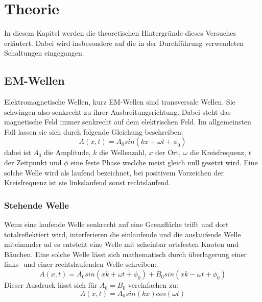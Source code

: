 \section{Theorie} 
\label{sec:Theorie}

In diesem Kapitel werden die theoretischen Hintergründe dieses Versuches erläutert. Dabei wird insbesondere auf die in der Durchführung verwendeten Schaltungen eingegangen.


\subsection{EM-Wellen}
\label{sec:themwellen}
Elektromagnetische Wellen, kurz EM-Wellen sind transversale Wellen. Sie schwingen also senkrecht zu ihrer
Ausbreitungsrichtung. Dabei steht das magnetische Feld immer senkrecht auf dem elektrischen Feld.
Im allgemeinsten Fall lassen sie sich durch folgende Gleichung beschreiben:
\begin{equation}
    \label{eq:wellenfunktion}
    A(x,t)=A_0sin(kx+\omega t+\phi_0)
\end{equation}
dabei ist $A_0$ die Amplitude, $k$ die Wellenzahl, $x$ der Ort, $\omega$ die Kreisfrequenz, $t$ der Zeitpunkt
und $\phi$ eine feste Phase weclche meist gleich null gesetzt wird. Eine solche Welle wird als laufend bezeichnet, bei positivem Vorzeichen der Kreisfrequenz
ist sie linkslaufend sonst rechtslaufend.


\subsubsection{Stehende Welle}
\label{sec:thstehendewelle}
Wenn eine laufende Welle senkrecht auf eine Grenzfläche trifft und dort totalreflektiert wird,
interferieren die einlaufende und die auslaufende Welle miteinander ud es entsteht eine Welle
mit scheinbar ortsfesten Knoten und Bäuchen. Eine solche Welle lässt sich mathematisch durch überlagerung
einer links- und einer rechtslaufenden Welle schreiben:
\begin{equation}
    \label{eq:stehendewelle}
    A(x,t)=A_0sin(xk+\omega t +\phi_0)+B_0sin(xk-\omega t +\phi_0)
\end{equation}
Dieser Ausdruck lässt sich für $A_0=B_0$ vereinfachen zu:
\begin{equation}
    A(x,t)=A_0sin(kx)cos(\omega t)
\end{equation}

